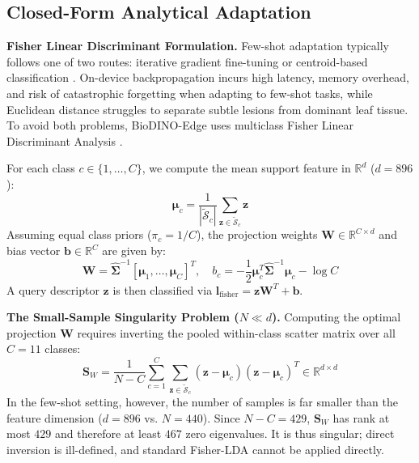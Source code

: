 \documentclass[conference]{IEEEtran}
\begin{document}
\subsection{Closed-Form Analytical Adaptation}
\label{sec:analytical_adaptation}
\textbf{Fisher Linear Discriminant Formulation.} Few-shot adaptation typically follows one of two routes: iterative gradient fine-tuning \cite{finn2017maml} or centroid-based classification \cite{snell2017prototypical}. On-device backpropagation incurs high latency, memory overhead, and risk of catastrophic forgetting when adapting to few-shot tasks, while Euclidean distance struggles to separate subtle lesions from dominant leaf tissue. To avoid both problems, BioDINO-Edge uses multiclass Fisher Linear Discriminant Analysis \cite{fisher1936use}.

For each class $c \in \{1, \dots, C\}$, we compute the mean support feature in $\mathbb{R}^d$ ($d = 896$):
\begin{equation}
    \boldsymbol{\mu}_c = \frac{1}{|\tilde{\mathcal{S}}_c|}\sum_{\mathbf{z} \in \tilde{\mathcal{S}}_c} \mathbf{z}
\end{equation}
Assuming equal class priors ($\pi_c = 1/C$), the projection weights $\mathbf{W} \in \mathbb{R}^{C \times d}$ and bias vector $\mathbf{b} \in \mathbb{R}^C$ are given by:
\begin{equation}
    \label{eq:fisher_weights}
    \mathbf{W} = \hat{\mathbf{\Sigma}}^{-1} [\boldsymbol{\mu}_1, \dots, \boldsymbol{\mu}_C]^T, \quad
    b_c = -\frac{1}{2} \boldsymbol{\mu}_c^T \hat{\mathbf{\Sigma}}^{-1} \boldsymbol{\mu}_c - \log C
\end{equation}
A query descriptor $\mathbf{z}$ is then classified via $\mathbf{l}_{\text{fisher}} = \mathbf{z} \mathbf{W}^T + \mathbf{b}$.

\medskip
\textbf{The Small-Sample Singularity Problem ($N \ll d$).} Computing the optimal projection $\mathbf{W}$ requires inverting the pooled within-class scatter matrix over all $C=11$ classes:
\begin{equation}
    \mathbf{S}_W = \frac{1}{N - C}\sum_{c=1}^C \sum_{\mathbf{z} \in \tilde{\mathcal{S}}_c} (\mathbf{z} - \boldsymbol{\mu}_c)(\mathbf{z} - \boldsymbol{\mu}_c)^T \in \mathbb{R}^{d \times d}
\end{equation}
In the few-shot setting, however, the number of samples is far smaller than the feature dimension ($d = 896$ vs. $N = 440$). Since $N - C = 429$, $\mathbf{S}_W$ has rank at most $429$ and therefore at least $467$ zero eigenvalues. It is thus singular; direct inversion is ill-defined, and standard Fisher-LDA cannot be applied directly.
\end{document}
